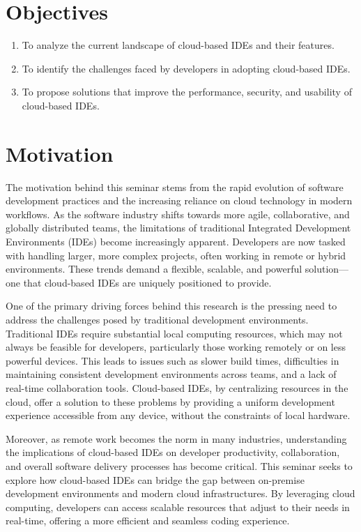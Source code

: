 \documentclass[12pt,a4paper,final]{report}
\begin{document}
\section{Objectives}
\begin{enumerate}
\item To analyze the current landscape of cloud-based IDEs and their features.
\item To identify the challenges faced by developers in adopting cloud-based IDEs.
\item To propose solutions that improve the performance, security, and usability of cloud-based IDEs.
\end{enumerate}

\section{Motivation}

The motivation behind this seminar stems from the rapid evolution of software development practices and the increasing reliance on cloud technology in modern workflows. As the software industry shifts towards more agile, collaborative, and globally distributed teams, the limitations of traditional Integrated Development Environments (IDEs) become increasingly apparent. Developers are now tasked with handling larger, more complex projects, often working in remote or hybrid environments. These trends demand a flexible, scalable, and powerful solution—one that cloud-based IDEs are uniquely positioned to provide.

One of the primary driving forces behind this research is the pressing need to address the challenges posed by traditional development environments. Traditional IDEs require substantial local computing resources, which may not always be feasible for developers, particularly those working remotely or on less powerful devices. This leads to issues such as slower build times, difficulties in maintaining consistent development environments across teams, and a lack of real-time collaboration tools. Cloud-based IDEs, by centralizing resources in the cloud, offer a solution to these problems by providing a uniform development experience accessible from any device, without the constraints of local hardware.

Moreover, as remote work becomes the norm in many industries, understanding the implications of cloud-based IDEs on developer productivity, collaboration, and overall software delivery processes has become critical. This seminar seeks to explore how cloud-based IDEs can bridge the gap between on-premise development environments and modern cloud infrastructures. By leveraging cloud computing, developers can access scalable resources that adjust to their needs in real-time, offering a more efficient and seamless coding experience. 
\end{document}
